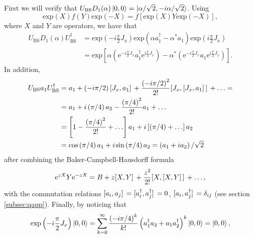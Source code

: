 First we will verify that $U_{\mathrm{BS}} D_1(\alpha)\ket{0, 0} = |\alpha/\sqrt{2},-i\alpha/\sqrt{2}\rangle$. Using \cite{barnett2002}
\begin{equation}
\mathrm{exp}\left(X\right)f\left(Y\right)\mathrm{exp}\left(-X\right) = f\left[\mathrm{exp}\left(X\right)Y \mathrm{exp}\left(- X\right)\right],
\label{coherent1step}
\end{equation}
where $X$ and $Y$ are operators, we have that
\begin{align}
U_{\mathrm{BS}} D_1(\alpha) U_{\mathrm{BS}}^\dagger &= \mathrm{exp}\left(-i\frac{\pi}{2}J_x\right) \mathrm{exp}\left(\alpha a_1^{\dagger} - \alpha^{*}a_1\right) \mathrm{exp}\left(i\frac{\pi}{2}J_x\right) 
\nonumber \\
&= \mathrm{exp}\left[\alpha \left(\mathrm{e}^{-i\frac{\pi}{2}J_x}a_1^{\dagger}\mathrm{e}^{i\frac{\pi}{2}J_x}\right) - \alpha^{*}\left(\mathrm{e}^{-i\frac{\pi}{2}J_x} a_1 \mathrm{e}^{i\frac{\pi}{2}J_x}\right)\right].
\end{align}
In addition, 
\begin{align}
U_{\mathrm{BS}} a_1 U_{\mathrm{BS}}^\dagger &= a_1 + \left( -i \pi/2 \right) \comm*{J_x}{a_1} + \frac{\left( -i \pi/2 \right)^2}{2!} \comm*{J_x}{\comm*{J_x}{a_1}} + \ldots = 
\nonumber \\ 
&= a_1 + i \left(\pi/4 \right) a_2 - \frac{\left(\pi/4 \right)^2}{2!} a_1 + \ldots
\nonumber \\
&= \left[ 1 - \frac{\left(\pi/4 \right)^2}{2!} + \ldots \right] a_1 + i \left[\left(\pi/4 \right) + \ldots \right] a_2
\nonumber \\
&= \mathrm{cos}\left(\pi/4\right) a_1 + i\hspace{0.1em}\mathrm{sin}\left(\pi/4\right) a_2 = \left(a_1 + i a_2\right)/\sqrt{2}
\label{opid1}
\end{align}
after combining the Baker-Campbell-Hausdorff formula \cite{yurke1986}
\begin{equation}
\mathrm{e}^{z X}Y\mathrm{e}^{-z X} =  B + z \comm*{X}{Y} + \frac{z^2}{2!} \comm*{X}{\comm*{X}{Y}} + \ldots,
\label{BCH}
\end{equation}
with the commutation relations $\comm*{a_i}{a_j} = \comm*{a_i^\dagger}{a_j^\dagger}=0$, $\comm*{a_i}{a_j^\dagger}=\delta_{ij}$ (see section \ref{subsec:qapp}). Finally, by noticing that 
\begin{equation}
\mathrm{exp}\left(-i\frac{\pi}{2}J_x\right)\ket{0, 0} = \sum_{k=0}^\infty \frac{\left(-i\pi/4\right)^k}{k!} \left( a_1^\dagger a_2 + a_1 a_2^\dagger \right)^k \ket{0, 0} = \ket{0, 0},
\end{equation}
